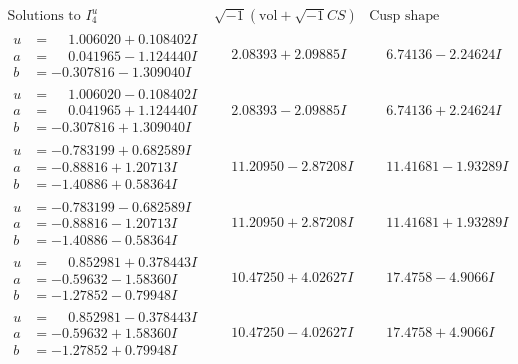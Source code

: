 \documentclass[1p]{elsarticle_modified}
\theoremstyle{definition}
\newcommand{\I}{\sqrt{-1}}
\begin{document}
$$\begin{array}{c|c|c}  
\text{Solutions to }I^u_{4}& \I (\text{vol} + \sqrt{-1}CS) & \text{Cusp shape}\\
 \hline 
\begin{aligned}
u &= \phantom{-}1.006020 + 0.108402 I \\
a &= \phantom{-}0.041965 - 1.124440 I \\
b &= -0.307816 - 1.309040 I\end{aligned}
 & \phantom{-}2.08393 + 2.09885 I & \phantom{-}6.74136 - 2.24624 I \\ \hline\begin{aligned}
u &= \phantom{-}1.006020 - 0.108402 I \\
a &= \phantom{-}0.041965 + 1.124440 I \\
b &= -0.307816 + 1.309040 I\end{aligned}
 & \phantom{-}2.08393 - 2.09885 I & \phantom{-}6.74136 + 2.24624 I \\ \hline\begin{aligned}
u &= -0.783199 + 0.682589 I \\
a &= -0.88816 + 1.20713 I \\
b &= -1.40886 + 0.58364 I\end{aligned}
 & \phantom{-}11.20950 - 2.87208 I & \phantom{-}11.41681 - 1.93289 I \\ \hline\begin{aligned}
u &= -0.783199 - 0.682589 I \\
a &= -0.88816 - 1.20713 I \\
b &= -1.40886 - 0.58364 I\end{aligned}
 & \phantom{-}11.20950 + 2.87208 I & \phantom{-}11.41681 + 1.93289 I \\ \hline\begin{aligned}
u &= \phantom{-}0.852981 + 0.378443 I \\
a &= -0.59632 - 1.58360 I \\
b &= -1.27852 - 0.79948 I\end{aligned}
 & \phantom{-}10.47250 + 4.02627 I & \phantom{-}17.4758 - 4.9066 I \\ \hline\begin{aligned}
u &= \phantom{-}0.852981 - 0.378443 I \\
a &= -0.59632 + 1.58360 I \\
b &= -1.27852 + 0.79948 I\end{aligned}
 & \phantom{-}10.47250 - 4.02627 I & \phantom{-}17.4758 + 4.9066 I \\ \hline\begin{aligned}

\end{aligned}
\end{array}$$
\end{document}
